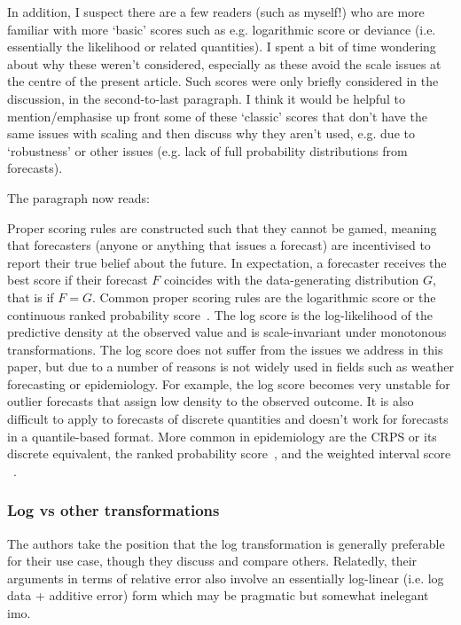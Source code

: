 \documentclass{article}
\newcommand{\red}{\color{red}}
\newcommand{\black}{\color{black}}
\begin{document}
In addition, I suspect there are a few readers (such as myself!) who are more familiar with more ‘basic’ scores such as e.g. logarithmic score or deviance (i.e. essentially the likelihood or related quantities). I spent a bit of time wondering about why these weren’t considered, especially as these avoid the scale issues at the centre of the present article. Such scores were only briefly considered in the discussion, in the second-to-last paragraph. I think it would be helpful to mention/emphasise up front some of these ‘classic’ scores that don’t have the same issues with scaling and then discuss why they aren’t used, e.g. due to ‘robustness’ or other issues (e.g. lack of full probability distributions from forecasts).

\black
The paragraph now reads: 

Proper scoring rules are constructed such that they cannot be gamed, meaning that forecasters (anyone or anything that issues a forecast) are incentivised to report their true belief about the future. In expectation, a forecaster receives the best score if their forecast $F$ coincides with the data-generating distribution $G$, that is if $F = G$. Common proper scoring rules are the logarithmic score \citep{goodRationalDecisions1952} or the continuous ranked probability score~\citep[CRPS,][]{gneitingStrictlyProperScoring2007}. The log score is the log-likelihood of the predictive density at the observed value and is scale-invariant under monotonous transformations. The log score does not suffer from the issues we address in this paper, but due to a number of reasons is not widely used in fields such as weather forecasting or epidemiology. For example, the log score becomes very unstable for outlier forecasts that assign low density to the observed outcome. It is also difficult to apply to forecasts of discrete quantities and doesn't work for forecasts in a quantile-based format. 
More common in epidemiology are the CRPS or its discrete equivalent, the ranked probability score~\citep[RPS,][]{funkAssessingPerformanceRealtime2019}, and the weighted interval score ~\citep[WIS,][]{bracherEvaluatingEpidemicForecasts2021}. 

\red
\subsubsection{Log vs other transformations}
The authors take the position that the log transformation is generally preferable for their use case, though they discuss and compare others. Relatedly, their arguments in terms of relative error also involve an essentially log-linear (i.e. log data + additive error) form which may be pragmatic but somewhat inelegant imo.
\end{document}
